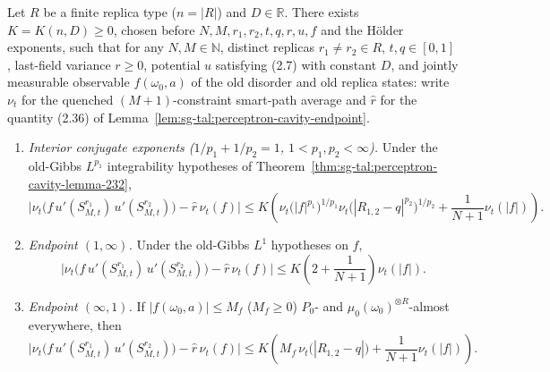 \begin{proposition}\label{prop:sg-tal:perceptron-cavity-prop-235}
  \leanok
Let $R$ be a finite replica type ($n=|R|$) and $D\in\mathbb R$. There exists $K=K(n,D)\ge0$, chosen before $N,M,r_1,r_2,t,q,r,u,f$ and the
H\"older exponents, such that for any $N,M\in\mathbb N$, distinct replicas $r_1\ne r_2\in R$, $t,q\in[0,1]$, last-field variance $r\ge0$,
potential $u$ satisfying (2.7) with constant $D$, and jointly measurable observable $f(\omega_0,a)$ of the old disorder and old replica states:
write $\nu_t$ for the quenched $(M+1)$-constraint smart-path average and $\widehat r$ for the quantity (2.36) of Lemma~\ref{lem:sg-tal:perceptron-cavity-endpoint}.
\begin{enumerate}
\item \emph{Interior conjugate exponents ($1/p_1+1/p_2=1$, $1<p_1,p_2<\infty$).} Under the old-Gibbs $L^{p_1}$ integrability
hypotheses of Theorem~\ref{thm:sg-tal:perceptron-cavity-lemma-232},
\[
 \bigl|\nu_t\bigl(f\,u'(S_{M,t}^{r_1})\,u'(S_{M,t}^{r_2})\bigr)-\widehat r\,\nu_t(f)\bigr|
 \le K\left(\nu_t\bigl(|f|^{p_1}\bigr)^{1/p_1}\nu_t\bigl(|R_{1,2}-q|^{p_2}\bigr)^{1/p_2}+\frac{1}{N+1}\nu_t(|f|)\right).
\]
\item \emph{Endpoint $(1,\infty)$.} Under the old-Gibbs $L^1$ hypotheses on $f$,
\[
 \bigl|\nu_t\bigl(f\,u'(S_{M,t}^{r_1})\,u'(S_{M,t}^{r_2})\bigr)-\widehat r\,\nu_t(f)\bigr|
 \le K\left(2+\frac{1}{N+1}\right)\nu_t(|f|).
\]
\item \emph{Endpoint $(\infty,1)$.} If $|f(\omega_0,a)|\le M_f$ ($M_f\ge0$) $P_0$- and $\mu_0(\omega_0)^{\otimes R}$-almost everywhere, then
\[
 \bigl|\nu_t\bigl(f\,u'(S_{M,t}^{r_1})\,u'(S_{M,t}^{r_2})\bigr)-\widehat r\,\nu_t(f)\bigr|
 \le K\left(M_f\,\nu_t\bigl(|R_{1,2}-q|\bigr)+\frac{1}{N+1}\nu_t(|f|)\right).
\]
\end{enumerate}
\end{proposition}
